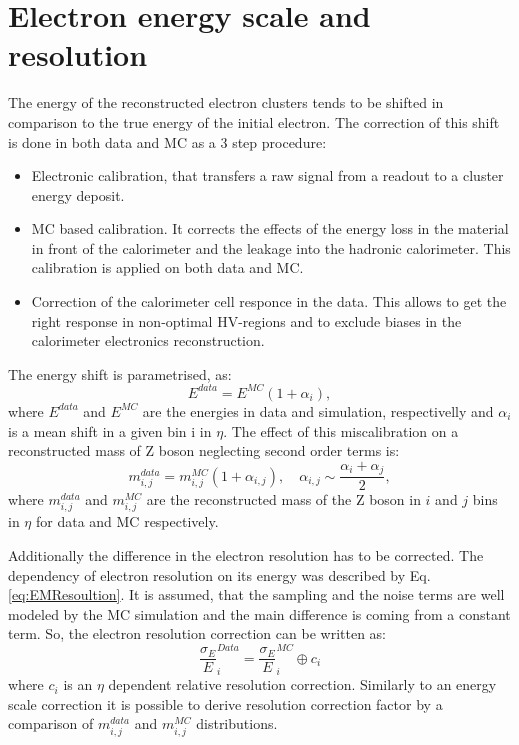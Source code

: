 \section{Electron energy scale and resolution}\label{sec:elecScale}
The energy of the reconstructed electron clusters tends to be shifted in comparison to the true energy of the initial electron. The correction of this shift is done in both data and MC as a 3 step procedure:
\begin{itemize}
\item Electronic calibration, that transfers a raw signal from a readout to a cluster energy deposit.
\item MC based calibration. It corrects the effects of the energy loss in the material in front of the calorimeter and the leakage into the hadronic calorimeter. This calibration is applied on both data and MC.
\item Correction of the calorimeter cell responce in the data. This allows to get the right response in non-optimal HV-regions and to exclude biases in the calorimeter electronics reconstruction.
\end{itemize}

The energy shift is parametrised, as:
\begin{equation}
E^{data}=E^{MC}(1+\alpha_i),
\end{equation}
where $E^{data}$ and $E^{MC}$ are the energies in data and simulation, respectivelly and $\alpha_i$ is a mean shift in a given bin i in $\eta$. The effect of this miscalibration on a reconstructed mass of Z boson neglecting second order terms is:
\begin{equation}
m_{i,j}^{data}=m_{i,j}^{MC}(1+\alpha_{i,j}), \quad \alpha_{i,j} \sim \frac{\alpha_i+\alpha_j}{2}, 
\end{equation}
where $m_{i,j}^{data}$ and $m_{i,j}^{MC}$ are the reconstructed mass of the Z boson in $i$ and $j$ bins in $\eta$ for data and MC respectively. 

Additionally the difference in the electron resolution has to be corrected. The dependency of electron resolution on its energy was described by Eq. \ref{eq:EMResoultion}. It is assumed, that the sampling and the noise terms are well modeled by the MC simulation and the main difference is coming from a constant term. 
So, the electron resolution correction can be written as:
\begin{equation}
\frac{\sigma_E}{E}^{Data}_{i}=\frac{\sigma_E}{E}^{MC}_{i} \oplus c_i
\end{equation}
where $c_i$ is an $\eta$ dependent relative resolution correction. Similarly to an energy scale correction it is possible to derive resolution correction factor by a comparison  of $m_{i,j}^{data}$ and $m_{i,j}^{MC}$ distributions. 

